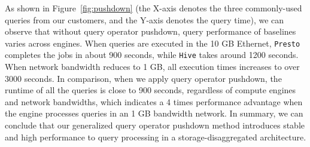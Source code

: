 As shown in Figure~\ref{fig:pushdown} (the X-axis denotes the three commonly-used queries from our customers, and the Y-axis denotes the query time), 
we can observe that  without query operator pushdown, query performance of baselines varies  across engines. When  queries are executed in the 10 GB Ethernet, \texttt{Presto} completes the jobs in about 900 seconds, while \texttt{Hive} takes around 1200 seconds. When network bandwidth reduces to 1 GB, all execution times increases to over 3000 seconds.
 In comparison, when we apply query operator pushdown, the runtime of all the queries is close to 900 seconds, regardless of compute engines and network bandwidths, which indicates a 4 times performance advantage when the engine processes queries in an 1 GB bandwidth network.  In summary, we can conclude that our generalized query operator pushdown method introduces stable and high performance to query processing in a storage-disaggregated architecture. 



